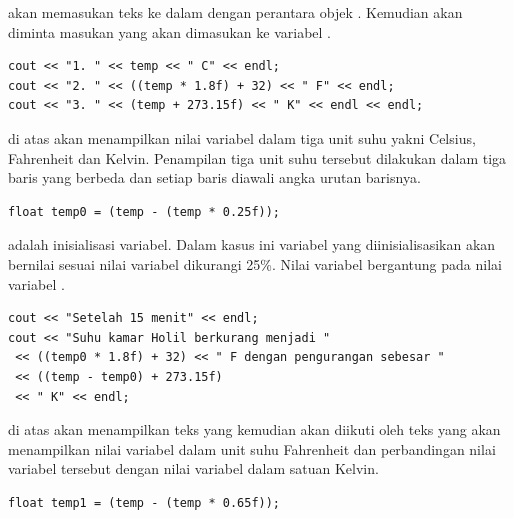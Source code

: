 \documentclass[../main.tex]{subfiles}
\begin{document}
{\Script}  akan memasukan teks  ke dalam {\ioo} {\stream} dengan perantara objek . Kemudian akan diminta masukan yang akan dimasukan ke variabel .

\begin{code}
\begin{verbatim}
cout << "1. " << temp << " C" << endl;
cout << "2. " << ((temp * 1.8f) + 32) << " F" << endl;
cout << "3. " << (temp + 273.15f) << " K" << endl << endl;
\end{verbatim}
\end{code}

{\Script} di atas akan menampilkan nilai variabel  dalam tiga unit suhu yakni Celsius, Fahrenheit dan Kelvin. Penampilan tiga unit suhu tersebut dilakukan dalam tiga baris yang berbeda dan setiap baris diawali angka urutan barisnya.

\begin{code}
\begin{verbatim}
float temp0 = (temp - (temp * 0.25f));
\end{verbatim}
\end{code}

{\Script}  adalah {\statement} inisialisasi variabel. Dalam kasus ini variabel yang diinisialisasikan akan bernilai sesuai nilai variabel  dikurangi 25\%. Nilai variabel  bergantung pada nilai variabel .

\begin{code}
\begin{verbatim}
cout << "Setelah 15 menit" << endl;
cout << "Suhu kamar Holil berkurang menjadi "
 << ((temp0 * 1.8f) + 32) << " F dengan pengurangan sebesar "
 << ((temp - temp0) + 273.15f)
 << " K" << endl;
\end{verbatim}
\end{code}

{\Script} di atas akan menampilkan teks  yang kemudian akan diikuti oleh teks yang akan menampilkan nilai variabel  dalam unit suhu Fahrenheit dan perbandingan nilai variabel tersebut dengan nilai variabel  dalam satuan Kelvin.

\begin{code}
\begin{verbatim}
float temp1 = (temp - (temp * 0.65f));
\end{verbatim}
\end{code}
\end{document}
